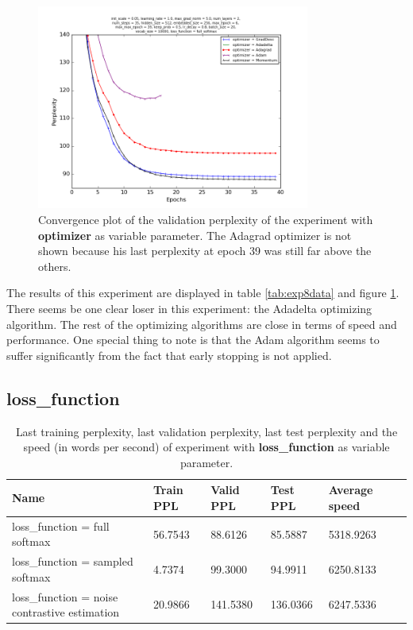 \documentclass[10pt,a4paper,titlepage]{article}
\begin{document}
\begin{figure}[H]
	\begin{center}
		\includegraphics[width=0.80\textwidth]{Figures/optimizerperf.png}
		\caption{Convergence plot of the validation perplexity of the experiment with \textbf{optimizer} as variable parameter. The Adagrad optimizer is not shown because his last perplexity at epoch 39 was still far above the others.}
		\label{fig:exp8perf}
	\end{center}	
\end{figure}


The results of this experiment are displayed in table \ref{tab:exp8data} and figure \ref{fig:exp8perf}. There seems be one clear loser in this experiment: the Adadelta optimizing algorithm. The rest of the optimizing algorithms are close in terms of speed and performance. One special thing to note is that the Adam algorithm seems to suffer significantly from the fact that early stopping is not applied.

\newpage

\subsection{loss\_function}

\begin{table}[H]
\centering
\caption{Last training perplexity, last validation perplexity, last test perplexity and the speed (in words per second) of experiment with \textbf{loss\_function} as variable parameter.}
\label{tab:exp9data}
\begin{tabular}{|l|l|l|l|l|l|}
\hline
{\small Name} & {\small Train PPL} & {\small Valid PPL} & {\small Test PPL} & {\small Average speed}\\ \hline
{\small loss\_function = full softmax }                 & 56.7543    & 88.6126    & 85.5887    & 5318.9263  \\ \hline
{\small loss\_function = sampled softmax }              & 4.7374     & 99.3000    & 94.9911    & 6250.8133  \\ \hline
{\small loss\_function = noise contrastive estimation}  & 20.9866    & 141.5380   & 136.0366   & 6247.5336  \\ \hline
\end{tabular}
\end{table}
\end{document}
